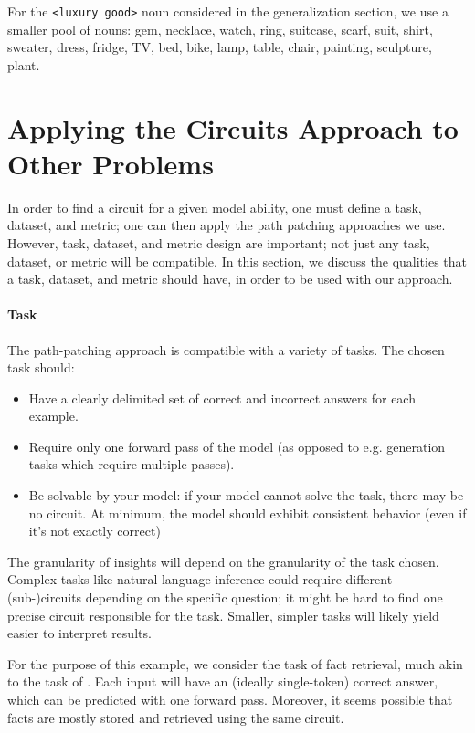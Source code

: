 \documentclass{article}
\begin{document}
    For the \texttt{<luxury good>} noun considered in the generalization section, we use a smaller pool of nouns: gem, necklace, watch, ring, suitcase, scarf, suit, shirt, sweater, dress, fridge, TV, bed, bike, lamp, table, chair, painting, sculpture, plant.

    \section{Applying the Circuits Approach to Other Problems}\label{app:circuits-other-problems}

    In order to find a circuit for a given model ability, one must define a task, dataset, and metric; one can then apply the path patching approaches we use. However, task, dataset, and metric design are important; not just any task, dataset, or metric will be compatible. In this section, we discuss the qualities that a task, dataset, and metric should have, in order to be used with our approach.

    \paragraph{Task} The path-patching approach is compatible with a variety of tasks. The chosen task should:

    \begin{itemize}
        \item Have a clearly delimited set of correct and incorrect answers for each example.
        \item Require only one forward pass of the model (as opposed to e.g. generation tasks which require multiple passes).
        \item Be solvable by your model: if your model cannot solve the task, there may be no circuit. At minimum, the model should exhibit consistent behavior (even if it’s not exactly correct)
    \end{itemize}
    
    The granularity of insights will depend on the granularity of the task chosen. Complex tasks like natural language inference could require different (sub-)circuits depending on the specific question; it might be hard to find one precise circuit responsible for the task. Smaller, simpler tasks will likely yield easier to interpret results.

    For the purpose of this example, we consider the task of fact retrieval, much akin to the task of \citet{meng2022locating}. Each input will have an (ideally single-token) correct answer, which can be predicted with one forward pass. Moreover, it seems possible that facts are mostly stored and retrieved using the same circuit.
\end{document}
